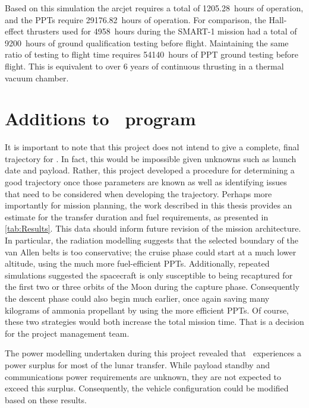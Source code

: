 Based on this simulation the arcjet requires a total of 1205.28~hours of operation, and the PPTs require 29176.82~hours of operation. For comparison, the Hall-effect thrusters used for 4958~hours during the SMART-1 mission had a total of 9200~hours of ground qualification testing before flight. Maintaining the same ratio of testing to flight time requires 54140~hours of PPT ground testing before flight. This is equivalent to over 6 years of continuous thrusting in a thermal vacuum chamber. 









\section{Additions to \BW\ program} \label{sec:BW1-additions}

It is important to note that this project does not intend to give a complete, final trajectory for \BW. In fact, this would be impossible given unknowns such as launch date and payload. Rather, this project developed a procedure for determining a good trajectory once those parameters are known as well as identifying issues that need to be considered when developing the trajectory. Perhaps more importantly for mission planning, the work described in this thesis provides an estimate for the transfer duration and fuel requirements, as presented in \autoref{tab:Results}. This data should inform future revision of the mission architecture. In particular, the radiation modelling suggests that the selected boundary of the van Allen belts is too conservative; the cruise phase could start at a much lower altitude, using the much more fuel-efficient PPTs. Additionally, repeated simulations suggested the spacecraft is only susceptible to being recaptured for the first two or three orbits of the Moon during the capture phase. Consequently the descent phase could also begin much earlier, once again saving many kilograms of ammonia propellant by using the more efficient PPTs. Of course, these two strategies would both increase the total mission time. That is a decision for the project management team.

The power modelling undertaken during this project revealed that \BW\ experiences a power surplus for most of the lunar transfer. While payload standby and communications power requirements are unknown, they are not expected to exceed this surplus. Consequently, the vehicle configuration could be modified based on these results.

